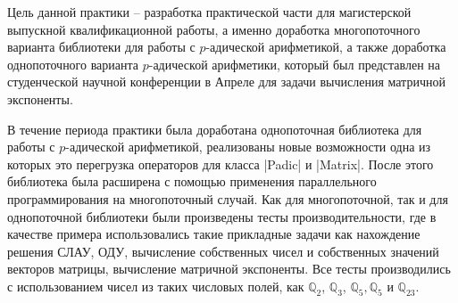 \documentclass[master, och, times, pract]{sty/SCWorks}
\theoremstyle{plain}
\theoremstyle{definition}
\numberwithin{equation}{section}
\begin{document}
\title{}



\title{}


\author{Шарова Александра Вадимовича}

\date{2020}

\maketitle
\tableofcontents


\intro

Цель данной практики -- разработка практической части для магистерской выпускной квалификационной работы, а именно доработка многопоточного варианта библиотеки для работы с $p$-адической арифметикой, а также доработка однопоточного варианта $p$-адической арифметики, который был представлен на студенческой научной конференции в Апреле для задачи вычисления матричной экспоненты.

В течение периода практики была доработана однопоточная библиотека для работы с $p$-адической арифметикой, реализованы новые возможности одна из которых это перегрузка операторов для класса |Padic| и |Matrix|. После этого библиотека была расширена с помощью применения параллельного программирования на многопоточный случай. Как для многопоточной, так и для однопоточной библиотеки были произведены тесты производительности, где в качестве примера использовались такие прикладные задачи как нахождение решения СЛАУ, ОДУ, вычисление собственных чисел и собственных значений векторов матрицы, вычисление матричной экспоненты. Все тесты производились с использованием чисел из таких числовых полей, как $\mathbb{Q}_2$, $\mathbb{Q}_3$, $\mathbb{Q}_5, \mathbb{Q}_5$ и $\mathbb{Q}_{23}$.
\end{document}
